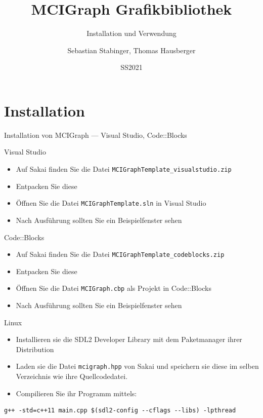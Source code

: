 \documentclass[presentation]{beamer}
\author{Sebastian Stabinger, Thomas Hausberger}
\date{SS2021}
\title{MCIGraph Grafikbibliothek}
\subtitle{Installation und Verwendung}
\begin{document}
\maketitle

\section{Installation}
\label{sec:org8273fe8}
\begin{frame}[label={sec:org16f0e7e},fragile]{Installation von MCIGraph --- Visual Studio, Code::Blocks}
 \begin{block}{Visual Studio}
\begin{itemize}
\item Auf Sakai finden Sie die Datei {\color{solarizedYellow}\texttt{MCIGraphTemplate\_visualstudio.zip}}
\item Entpacken Sie diese
\item Öffnen Sie die Datei {\color{solarizedYellow}\texttt{MCIGraphTemplate.sln} }in Visual Studio
\item Nach Ausführung sollten Sie ein Beispielfenster sehen
\end{itemize}
\end{block}
\begin{block}{Code::Blocks}
\begin{itemize}
\item Auf Sakai finden Sie die Datei {\color{solarizedYellow}\texttt{MCIGraphTemplate\_codeblocks.zip}}
\item Entpacken Sie diese
\item Öffnen Sie die Datei {\color{solarizedYellow}\texttt{MCIGraph.cbp} }als Projekt in Code::Blocks
\item Nach Ausführung sollten Sie ein Beispielfenster sehen
\end{itemize}
\end{block}
\end{frame}
\begin{frame}[label={sec:org62cff75},fragile]{Linux}
 \begin{itemize}
\item Installieren sie die SDL2 Developer Library mit dem Paketmanager
ihrer Distribution
\item Laden sie die Datei {\color{solarizedYellow}\texttt{mcigraph.hpp} }von Sakai und speichern sie diese
im selben Verzeichnis wie ihre Quellcodedatei.
\item Compilieren Sie ihr Programm mittels:
\end{itemize}
\begin{verbatim}
g++ -std=c++11 main.cpp $(sdl2-config --cflags --libs) -lpthread
\end{verbatim}
\end{frame}
\end{document}
